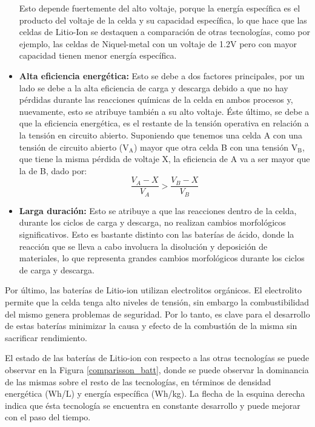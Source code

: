 \documentclass[10pt,a4paper]{article}
\begin{document}
\begin{itemize}
            Esto depende fuertemente del 
            alto voltaje, porque la energía específica es el producto del voltaje 
            de la celda y su capacidad específica, lo que hace que las celdas de 
            Litio-Ion se destaquen a comparación de otras tecnologías, 
            como por ejemplo, las celdas de Niquel-metal con un voltaje de 1.2V 
            pero con mayor capacidad tienen menor energía específica. 
		\item \textbf{Alta eficiencia energética:} Esto se debe a dos 
        factores principales, por un lado se debe a la alta eficiencia de 
        carga y descarga debido a que no hay pérdidas durante las reacciones 
        químicas de la celda en ambos procesos y, nuevamente, esto se atribuye 
        también a su alto voltaje. Éste último, se debe a que la eficiencia 
        energética, es el restante de la tensión operativa en relación a la 
        tensión en circuito abierto. Suponiendo que tenemos una celda A con una 
        tensión de circuito abierto ($\mathrm{V_A}$) mayor que otra celda B con 
        una tensión $\mathrm{V_B}$, que tiene la misma pérdida de voltaje X, 
        la eficiencia de A va a ser mayor que la de B, dado por:
        \vspace{5mm}
		\begin{equation}
			\frac{V_A - X}{V_A} > \frac{V_B - X}{V_B} \nonumber
		\end{equation}
		\item \textbf{Larga duración:} Esto se atribuye a que las reacciones 
        dentro de la celda, durante los ciclos de carga y descarga, no realizan 
        cambios morfológicos significativos. Esto es bastante distinto con las 
        baterías de ácido, donde la reacción que se lleva a cabo involucra la 
        disolución y deposición de materiales, lo que representa grandes 
        cambios morfológicos durante los ciclos de carga y descarga.
	\end{itemize}
	
	\noindent Por último, las baterías de Litio-ion utilizan electrolitos 
    orgánicos. El electrolito permite que la celda tenga alto niveles de 
    tensión, sin embargo la combustibilidad del mismo genera problemas de 
    seguridad. Por lo tanto, es clave para el desarrollo de estas baterías 
    minimizar la causa y efecto de la combustión de la misma sin sacrificar 
    rendimiento.
	
	\noindent El estado de las baterías de Litio-ion con respecto a las otras 
    tecnologías se puede observar en la Figura \ref{comparisson_batt}, donde se 
    puede observar la dominancia de las mismas sobre el resto de las 
    tecnologías, en términos de densidad energética (Wh/L) y energía específica 
    (Wh/kg). La flecha de la esquina derecha indica que ésta tecnología se 
    encuentra en constante desarrollo y puede mejorar con el paso del tiempo.
\end{document}
